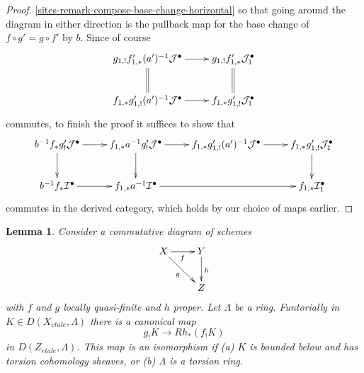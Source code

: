 \documentclass{stacks-project}
\theoremstyle{plain}
\newtheorem{lemma}[subsection]{Lemma}
\theoremstyle{definition}
\theoremstyle{remark}
\numberwithin{equation}{subsection}
\def\etale{{\acute{e}tale}}
\begin{document}
\begin{proof}
\ref{sites-remark-compose-base-change-horizontal}
so that going around the diagram in either direction is the pullback
map for the base change of $f \circ g' = g \circ f'$ by $b$.
Since of course
$$
\xymatrix{
g_{1, !}f'_{1, *}(a')^{-1}\mathcal{J}^\bullet \ar@{=}[d] \ar[r] &
g_{1, !}f'_{1, *}\mathcal{J}_1^\bullet \ar@{=}[d] \\
f_{1, *}g'_{1, !}(a')^{-1}\mathcal{J}^\bullet \ar[r] &
f_{1, *}g'_{1, !}\mathcal{J}_1^\bullet 
}
$$
commutes, to finish the proof it suffices to show that
$$
\xymatrix{
b^{-1}f_*g'_!\mathcal{J}^\bullet \ar[r] \ar[d] &
f_{1, *}a^{-1}g'_!\mathcal{J}^\bullet \ar[r] \ar[d] &
f_{1, *}g'_{1, !}(a')^{-1}\mathcal{J}^\bullet \ar[r] &
f_{1, *}g'_{1, !}\mathcal{J}_1^\bullet \ar[d] \\
b^{-1}f_*\mathcal{I}^\bullet \ar[r] &
f_{1, *}a^{-1}\mathcal{I}^\bullet \ar[rr] & &
f_{1, *}\mathcal{I}_1^\bullet
}
$$
commutes in the derived category, which holds by our choice of
maps earlier.
\end{proof}

\begin{lemma}
\label{lemma-shriek-lqf-and-proper}
Consider a commutative diagram of schemes
$$
\xymatrix{
X \ar[r]_f \ar[rd]_g & Y \ar[d]^h \\
& Z
}
$$
with $f$ and $g$ locally quasi-finite and $h$ proper. Let $\Lambda$ be a ring.
Funtorially in $K \in D(X_\etale, \Lambda)$ there is a canonical map
$$
g_!K \longrightarrow Rh_*(f_!K)
$$
in $D(Z_\etale, \Lambda)$. This map is an isomorphism if
(a) $K$ is bounded below and has torsion cohomology sheaves, or
(b) $\Lambda$ is a torsion ring.
\end{lemma}
\end{document}
